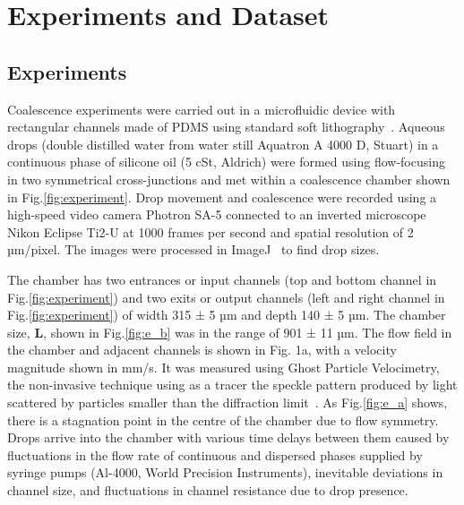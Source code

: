 \documentclass[twoside,twocolumn,9pt]{article}
\begin{document}
\section{Experiments and Dataset}\label{Experiments and Dataset}
\subsection{Experiments}\label{Experiments}

Coalescence experiments were carried out in a microfluidic device with rectangular channels made of PDMS using standard soft lithography~\cite{kim2008soft}. Aqueous drops (double distilled water from water still Aquatron A 4000 D, Stuart)  in a continuous phase of silicone oil (5 cSt, Aldrich) were formed using flow-focusing~\cite{kovalchuk2019drop} in two symmetrical cross-junctions and met within a coalescence chamber shown in Fig.\ref{fig:experiment}. Drop movement and coalescence were recorded using a high-speed video camera Photron SA-5 connected to an inverted microscope Nikon Eclipse Ti2-U at 1000 frames per second and spatial resolution of 2 µm/pixel. The images were processed in ImageJ~\cite{schneider2012nih} to find drop sizes. 

The chamber has two entrances or input channels (top and bottom channel in Fig.\ref{fig:experiment}) and two exits or output channels (left and right channel in Fig.\ref{fig:experiment}) of width 315 ± 5 µm and depth 140 ± 5 µm. The chamber size, $\mathbf{L}$, shown in Fig.\ref{fig:e_b} was in the range of 901 ± 11 µm. The flow field in the chamber and adjacent channels is shown in Fig. 1a,  with a velocity magnitude shown in mm/s. It was measured using Ghost Particle Velocimetry, the non-invasive technique using as a tracer the speckle pattern produced by light scattered by particles smaller than the diffraction limit~\cite{buzzaccaro2013ghost,kovalchuk2018study}. As Fig.\ref{fig:e_a} shows, there is a stagnation point in the centre of the chamber due to flow symmetry. Drops arrive into the chamber with various time delays between them caused by fluctuations in the flow rate of continuous and dispersed phases supplied by syringe pumps (Al-4000, World Precision Instruments), inevitable deviations in channel size, and fluctuations in channel resistance due to drop presence. 
\end{document}
